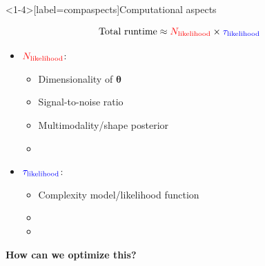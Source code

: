 \documentclass[usenames,dvipsnames,t]{beamer}
\newcommand{\boldtheta}{\boldsymbol{\theta}}
\begin{document}
\begin{frame}<1-4>[label=compaspects]{Computational aspects}

  \def\x{3mm}
  \def\y{1mm}

  \begin{equation*}
    {\rm{Total \ runtime}} \approx \textcolor{red}{N_{{\rm{likelihood}}}} \times \textcolor{blue}{\tau_{{\rm{likelihood}}}}
  \end{equation*}

  \pause

  \begin{itemize}
    \item $\textcolor{red}{N_{{\rm{likelihood}}}}$:
    \begin{itemize}
      \item Dimensionality of $\boldtheta$
      
      \vspace{\y}
      
      \item Signal-to-noise ratio
      
      \vspace{\y}
      
      \item Multimodality/shape posterior
      
      \vspace{\y}

      \item {}

    \end{itemize}

    \vspace{\x}
    \pause

    \item $\textcolor{blue}{\tau_{{\rm{likelihood}}}}$:
    \begin{itemize}
      \item Complexity model/likelihood function

      \vspace{\y}

      \item {}


      \vspace{\y}
      
      \item {}
    \end{itemize}
  \end{itemize}

  \pause
  \vspace{6mm}

  \textbf{How can we optimize this?}
\end{frame}
\end{document}
